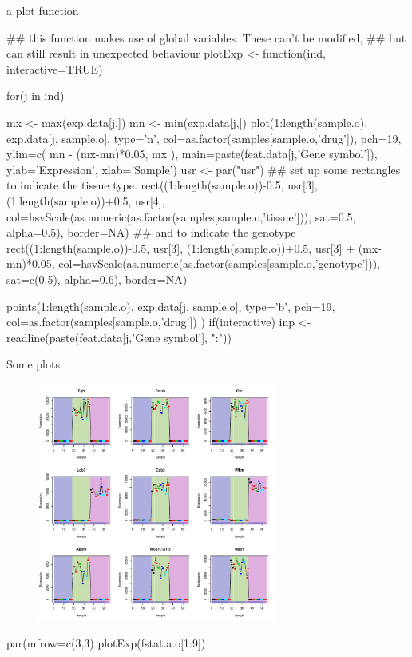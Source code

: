 \documentclass[pdf]{beamer}
\begin{document}
\begin{frame}[fragile]{a plot function}
  \begin{rcode}
    ## this function makes use of global variables. These can't be modified,
    ## but can still result in unexpected behaviour
    plotExp <- function(ind, interactive=TRUE){
      for(j in ind){
        mx <- max(exp.data[j,])
        mn <- min(exp.data[j,])
        plot(1:length(sample.o), exp.data[j, sample.o],
             type='n', col=as.factor(samples[sample.o,'drug']), pch=19,
             ylim=c( mn - (mx-mn)*0.05, mx ),
             main=paste(feat.data[j,'Gene symbol']), ylab='Expression', xlab='Sample')
        usr <- par("usr")
        ## set up some rectangles to indicate the tissue type.
        rect((1:length(sample.o))-0.5, usr[3], (1:length(sample.o))+0.5, usr[4],
             col=hsvScale(as.numeric(as.factor(samples[sample.o,'tissue'])), 
                          sat=0.5, alpha=0.5), border=NA)
        ## and to indicate the genotype
        rect((1:length(sample.o))-0.5, usr[3], (1:length(sample.o))+0.5, usr[3] + (mx-mn)*0.05,
             col=hsvScale(as.numeric(as.factor(samples[sample.o,'genotype'])), 
             sat=c(0.5), alpha=0.6), border=NA)
        
        points(1:length(sample.o), exp.data[j, sample.o], type='b',
        pch=19, col=as.factor(samples[sample.o,'drug']) )
        if(interactive)
            inp <- readline(paste(feat.data[j,'Gene symbol'], ":"))
      }
    }
  \end{rcode}
\end{frame}

\begin{frame}[fragile]{Some plots}
  \begin{figure}[ht]
    \includegraphics[width=0.7\textwidth]{images/fstatAll}
  \end{figure}
  \vspace{-3ex}
  \begin{rcode}
    par(mfrow=c(3,3)
    plotExp(fstat.a.o[1:9])
  \end{rcode}
\end{frame}
\end{document}
